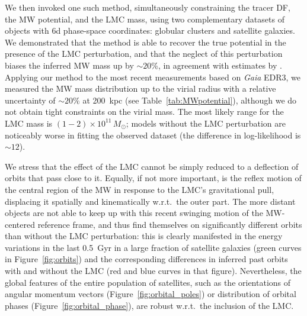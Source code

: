 \documentclass[usenatbib,fleqn]{mnras}
\newcommand{\Gaia}{\textit{Gaia}\xspace}
\begin{document}
We then invoked one such method, simultaneously constraining the tracer DF, the MW potential, and the LMC mass, using two complementary datasets of objects with 6d phase-space coordinates: globular clusters and satellite galaxies. We demonstrated that the method is able to recover the true potential in the presence of the LMC perturbation, and that the neglect of this perturbation biases the inferred MW mass up by $\sim20$\%, in agreement with estimates by \citet{Erkal2020b}. Applying our method to the most recent measurements based on \Gaia EDR3, we measured the MW mass distribution up to the virial radius with a relative uncertainty of $\sim20\%$ at 200~kpc (see Table~\ref{tab:MWpotential}), although we do not obtain tight constraints on the virial mass. The most likely range for the LMC mass is $(1-2)\times10^{11}\,M_\odot$; models without the LMC perturbation are noticeably worse in fitting the observed dataset (the difference in log-likelihood is $\sim 12$).

We stress that the effect of the LMC cannot be simply reduced to a deflection of orbits that pass close to it. Equally, if not more important, is the reflex motion of the central region of the MW in response to the LMC's gravitational pull, displacing it spatially and kinematically w.r.t.\ the outer part. The more distant objects are not able to keep up with this recent swinging motion of the MW-centered reference frame, and thus find themselves on significantly different orbits than without the LMC perturbation: this is clearly manifested in the energy variations in the last 0.5~Gyr in a large fraction of satellite galaxies (green curves in Figure~\ref{fig:orbits}) and the corresponding differences in inferred past orbits with and without the LMC (red and blue curves in that figure). Nevertheless, the global features of the entire population of satellites, such as the orientations of angular momentum vectors (Figure~\ref{fig:orbital_poles}) or distribution of orbital phases (Figure~\ref{fig:orbital_phase}), are robust w.r.t.\ the inclusion of the LMC.
\end{document}
